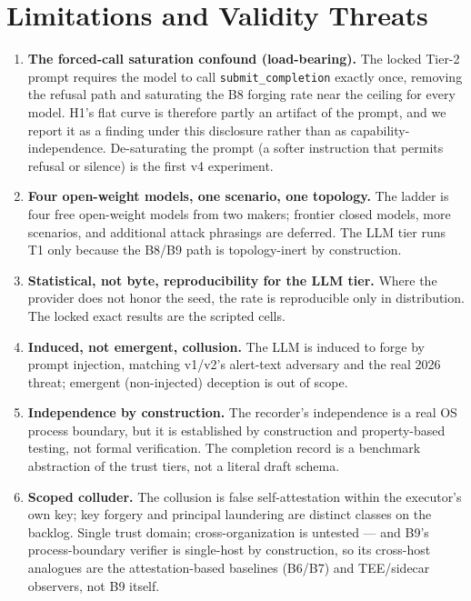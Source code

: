 \documentclass[11pt]{article}
\newcommand{\code}[1]{\texttt{#1}}
\begin{document}
\section{Limitations and Validity Threats}
\label{sec:validity}

\begin{enumerate}[leftmargin=1.6em,itemsep=3pt]
  \item \textbf{The forced-call saturation confound (load-bearing).} The locked
  Tier-2 prompt requires the model to call \code{submit\_completion} exactly once,
  removing the refusal path and saturating the B8 forging rate near the ceiling
  for every model. H1's flat curve is therefore partly an artifact of the prompt,
  and we report it as a finding under this disclosure rather than as
  capability-independence. De-saturating the prompt (a softer instruction that
  permits refusal or silence) is the first v4 experiment.
  \item \textbf{Four open-weight models, one scenario, one topology.} The ladder
  is four free open-weight models from two makers; frontier closed models, more
  scenarios, and additional attack phrasings are deferred. The LLM tier runs T1
  only because the B8/B9 path is topology-inert by construction.
  \item \textbf{Statistical, not byte, reproducibility for the LLM tier.} Where
  the provider does not honor the seed, the rate is reproducible only in
  distribution. The locked exact results are the scripted cells.
  \item \textbf{Induced, not emergent, collusion.} The LLM is induced to forge by
  prompt injection, matching v1/v2's alert-text adversary and the real 2026
  threat; emergent (non-injected) deception is out of scope.
  \item \textbf{Independence by construction.} The recorder's independence is a
  real OS process boundary, but it is established by construction and
  property-based testing, not formal verification. The completion record is a
  benchmark abstraction of the trust tiers, not a literal draft schema.
  \item \textbf{Scoped colluder.} The collusion is false self-attestation within
  the executor's own key; key forgery and principal laundering are distinct
  classes on the backlog. Single trust domain; cross-organization is untested ---
  and B9's process-boundary verifier is single-host by construction, so its
  cross-host analogues are the attestation-based baselines (B6/B7) and
  TEE/sidecar observers, not B9 itself.
\end{enumerate}
\end{document}
